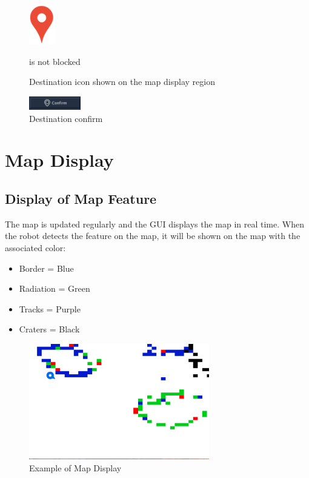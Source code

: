 \documentclass[12pt,a4paper]{article}
\begin{document}
\begin{figure}[!htb]
\centering
\includegraphics[width=0.1\textwidth]{Destination.png}
\caption{Destination icon shown on the map display region}
\label{destination}is not blocked
\end{figure}

\begin{figure}[!htb]
\centering
\includegraphics[width=0.2\textwidth]{DestinationConfirm.png}
\caption{Destination confirm }
\label{destination confirm}
\end{figure}


\newpage
\section{Map Display}
\subsection{Display of Map Feature} 
The map is updated regularly and the GUI displays the map in real time. When the robot detects the feature on the map, it will be shown on the map with the associated color:
\begin{itemize} 
\item Border = Blue
\item Radiation = Green
\item Tracks = Purple
\item Craters = Black
\end{itemize}

\begin{figure}[!htb]
\centering
\includegraphics[width=0.7\textwidth]{ExampleOfMapDisplay.png}
\caption{Example of Map Display}
\end{figure}
\end{document}

